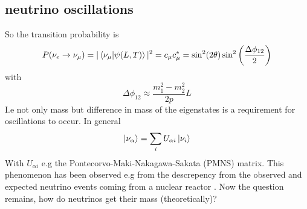 \documentclass[11pt,a4paper,faculty=we,language=en,doctype=report]{cls/ugent-doc}
\begin{document}
\subsection{neutrino oscillations}
So the transition probability is
\begin{equation}
	P(\nu_e\rightarrow\nu_\mu) = |\braket{\nu_\mu|\psi(L,T)}|^2 = c_\mu c_\mu^* = \sin ^2(2 \theta) \sin ^2\left(\frac{\Delta \phi_{12}}{2}\right)
\end{equation}
with
\begin{equation}
	\Delta \phi_{12} \approx \frac{m_1^2 - m_2^2}{2p}L
\end{equation}
I.e not only mass but difference in mass of the eigenstates is a requirement for oscillations to occur.
In general
\begin{equation}
	\ket{\nu_\alpha} = \sum_iU_{\alpha i} \ket{\nu_i}
\end{equation}
With $U_{\alpha i}$ e.g the Pontecorvo-Maki-Nakagawa-Sakata (PMNS) matrix. 
This phenomenon has been observed e.g from the descrepency from the observed
and expected neutrino events coming from a nuclear reactor \cite{Eguchi_2003}.
Now the question remains, how do neutrinos get their mass (theoretically)?
\end{document}
